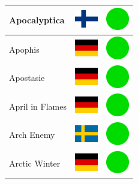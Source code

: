 \documentclass[12pt, a4paper, twoside]{report}
\begin{document}
\begin{center}
\begin{longtable}{|p{5cm}|p{2cm}|p{2cm}|}
 Apocalyptica                                               & \includegraphics[width=1cm]{../img/flags/fi} &   \includegraphics[width=1cm]{../likes/y} \\ \hline
 Apophis                                                    & \includegraphics[width=1cm]{../img/flags/de} &   \includegraphics[width=1cm]{../likes/y} \\ \hline
 Apostasie                                                  & \includegraphics[width=1cm]{../img/flags/de} &   \includegraphics[width=1cm]{../likes/y} \\ \hline
 April in Flames                                            & \includegraphics[width=1cm]{../img/flags/de} &   \includegraphics[width=1cm]{../likes/y} \\ \hline
 Arch Enemy                                                 & \includegraphics[width=1cm]{../img/flags/se} &   \includegraphics[width=1cm]{../likes/y} \\ \hline
 Arctic Winter                                              & \includegraphics[width=1cm]{../img/flags/de} &   \includegraphics[width=1cm]{../likes/y} \\ \hline

\end{longtable}
\end{center}
\end{document}
